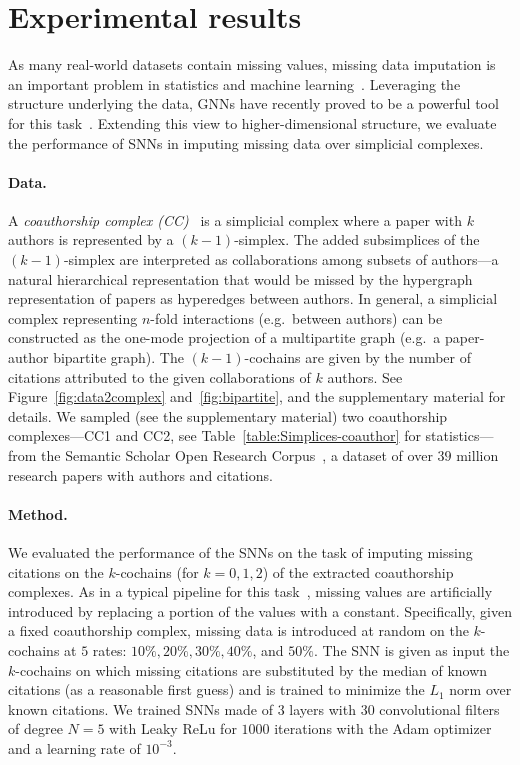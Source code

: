 \section{Experimental results}

As many real-world datasets contain missing values, missing data imputation is an important problem in statistics and machine learning~\cite{little1986statistical, nelwamondo2007missing}.
Leveraging the structure underlying the data, GNNs have recently proved to be a powerful tool for this task~\cite{spinelli2020neural}.
Extending this view to higher-dimensional structure, we evaluate the performance of SNNs in imputing missing data over simplicial complexes.

\paragraph{Data.}
A \emph{coauthorship complex (CC)}~\cite{patania2017} is a simplicial complex where a paper with $k$ authors is represented by a $(k-1)$-simplex.
The added subsimplices of the $(k-1)$-simplex are interpreted as collaborations among subsets of authors---a natural hierarchical representation that would be missed by the hypergraph representation of papers as hyperedges between authors.
In general, a simplicial complex representing $n$-fold interactions (e.g.\ between authors) can be constructed as the one-mode projection of a multipartite graph (e.g.\ a paper-author bipartite graph).
The $(k-1)$-cochains are given by the number of citations attributed to the given collaborations of $k$ authors.
See Figure~\ref{fig:data2complex} and~\ref{fig:bipartite}, and the supplementary material for details.
We sampled (see the supplementary material) two coauthorship complexes---CC1 and CC2, see Table~\ref{table:Simplices-coauthor} for statistics---from the Semantic Scholar Open Research Corpus~\cite{ammar18NAACL}, a dataset of over $39$ million research papers with authors and citations.

\paragraph{Method.}
We evaluated the performance of the SNNs on the task of imputing missing citations on the $k$-cochains (for $k=0,1,2$) of the extracted coauthorship complexes.
As in a typical pipeline for this task~\cite{nelwamondo2007missing}, missing values are artificially introduced by replacing a portion of the values with a constant.
Specifically, given a fixed coauthorship complex, missing data is introduced at random on the $k$-cochains at $5$ rates: $10\%, 20\%,  30\% ,40\%$, and $50\%$.
The SNN is given as input the $k$-cochains on which missing citations are substituted by the median of known citations (as a reasonable first guess) and is trained to minimize the $L_1$ norm over known citations.
We trained SNNs made of $3$ layers with $30$ convolutional filters of degree $N=5$ with Leaky ReLu for $1000$ iterations with the Adam optimizer and a learning rate of $10^{-3}$.


